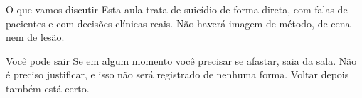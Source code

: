 \begin{frame}{}
\begin{caixaavaliar}{O que vamos discutir}
Esta aula trata de suic\'idio de forma direta, com falas de pacientes e com
decis\~oes cl\'inicas reais. N\~ao haver\'a imagem de m\'etodo, de cena nem de
les\~ao.
\end{caixaavaliar}

\CRvg
\begin{caixaproteger}{Voc\^e pode sair}
Se em algum momento voc\^e precisar se afastar, saia da sala. N\~ao \'e preciso
justificar, e isso n\~ao ser\'a registrado de nenhuma forma. Voltar depois
tamb\'em est\'a certo.
\end{caixaproteger}

\CRvg
\begin{center}
\end{center}
\end{frame}

